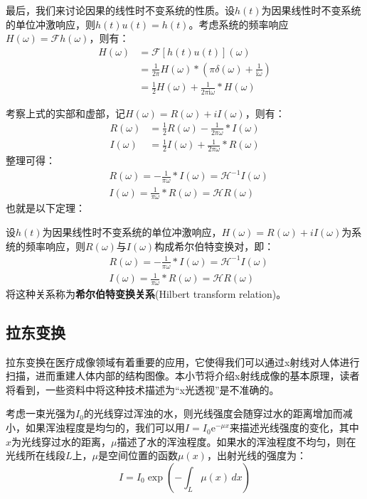 最后，我们来讨论因果的线性时不变系统的性质。设$h(t)$为因果线性时不变系统的单位冲激响应，则$h(t)u(t)=h(t)$。考虑系统的频率响应$H(\omega)=\mathcal{F} h(\omega)$，则有：
\begin{align*}
    H(\omega)&=\mathcal{F} [h(t)u(t)](\omega)\\
    &=\frac{1}{2\pi}H(\omega)*\left(\pi\delta(\omega)+\frac{1}{\mathrm{i}\omega}\right)\\
    &=\frac{1}{2}H(\omega)+\frac{1}{2\pi \mathrm{i}\omega}*H(\omega)
\end{align*}

考察上式的实部和虚部，记$H(\omega)=R(\omega)+iI(\omega)$，则有：
\begin{align*}
    R(\omega)&=\frac{1}{2}R(\omega)-\frac{1}{2\pi \omega}*I(\omega)\\
    I(\omega)&=\frac{1}{2}I(\omega)+\frac{1}{2\pi \omega}*R(\omega)
\end{align*}
整理可得：
\begin{align*}
    &R(\omega)=-\frac{1}{\pi \omega}*I(\omega)=\mathcal{H} ^{-1}I(\omega)\\
    &I(\omega)=\frac{1}{\pi \omega}*R(\omega)=\mathcal{H} R(\omega)
\end{align*}
也就是以下定理：
\begin{theorem}[希尔伯特变换关系]
    设$h(t)$为因果线性时不变系统的单位冲激响应，$H(\omega)=R(\omega)+iI(\omega)$为系统的频率响应，则$R(\omega)$与$I(\omega)$构成希尔伯特变换对，即：
    \begin{align*}
    &R(\omega)=-\frac{1}{\pi \omega}*I(\omega)=\mathcal{H} ^{-1}I(\omega)\\
    &I(\omega)=\frac{1}{\pi \omega}*R(\omega)=\mathcal{H} R(\omega)
\end{align*}
将这种关系称为\textbf{希尔伯特变换关系}(Hilbert transform relation)。
\end{theorem}

\subsection{拉东变换}\label{sub:radon}

拉东变换在医疗成像领域有着重要的应用，它使得我们可以通过x射线对人体进行扫描，进而重建人体内部的结构图像。本小节将介绍x射线成像的基本原理，读者将看到，一些资料中将这种技术描述为“x光透视”是不准确的。

考虑一束光强为$I_0$的光线穿过浑浊的水，则光线强度会随穿过水的距离增加而减小，如果浑浊程度是均匀的，我们可以用$I=I_0 \mathrm{e}^{-\mu x}$来描述光线强度的变化，其中$x$为光线穿过水的距离，$\mu$描述了水的浑浊程度。如果水的浑浊程度不均匀，则在光线所在线段$L$上，$\mu$是空间位置的函数$\mu(x)$，出射光线的强度为：
\[I=I_0 \exp\left(-\int_{L}\mu(x)\,dx\right)\]

